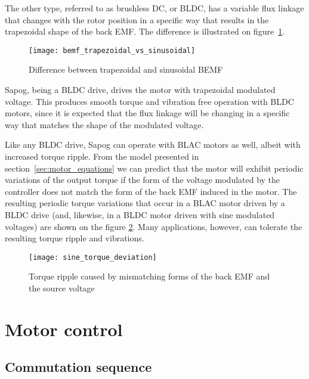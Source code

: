\documentclass{zubaxdoc}
\begin{document}
The other type, referred to as brushless DC, or BLDC, has a variable flux linkage that changes with the
rotor position in a specific way that results in the trapezoidal shape of the back EMF.
The difference is illustrated on figure~\ref{bemf_trapezoidal_vs_sinusoidal}.

\begin{figure}[hbt]
    \centering
    \texttt{[image: bemf\_trapezoidal\_vs\_sinusoidal]}
    \caption{Difference between trapezoidal and sinusoidal BEMF
    \label{bemf_trapezoidal_vs_sinusoidal}}
\end{figure}

Sapog, being a BLDC drive, drives the motor with trapezoidal modulated voltage.
This produces smooth torque and vibration free operation with BLDC motors,
since it is expected that the flux linkage will be changing in a specific way
that matches the shape of the modulated voltage.

Like any BLDC drive, Sapog can operate with BLAC motors as well, albeit with increased torque ripple.
From the model presented in section~\ref{sec:motor_equations} we can predict that the motor
will exhibit periodic variations of the output torque if the form of the voltage modulated by the controller
does not match the form of the back EMF induced in the motor.
The resulting periodic torque variations that occur in a BLAC motor driven by a BLDC drive
(and, likewise, in a BLDC motor driven with sine modulated voltages) are shown on the figure
\ref{sine_torque_deviation}.
Many applications, however, can tolerate the resulting torque ripple and vibrations.

\begin{figure}[hbt]
    \centering
    \texttt{[image: sine\_torque\_deviation]}
    \caption{Torque ripple caused by mismatching forms of the back EMF and the source voltage
    \label{sine_torque_deviation}}
\end{figure}

\section{Motor control}

\subsection{Commutation sequence}

\newcommand{\BEMFH}{$\uparrow$}
\newcommand{\BEMFL}{$\downarrow$}
\end{document}
